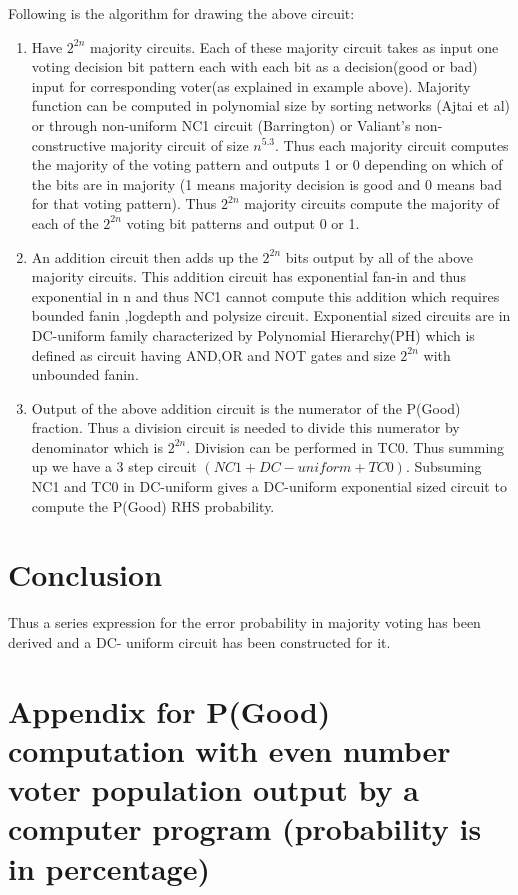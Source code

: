 \documentclass[11pt,onecolumn]{article}
\begin{document}
Following is the algorithm for drawing the above circuit:
\begin{enumerate}
\item Have $2^{2n}$ majority circuits. Each of these majority circuit takes as input one voting
decision bit pattern each with each bit as a decision(good or bad) input for
corresponding voter(as explained in example above). Majority function can be computed
in polynomial size by sorting networks (Ajtai et al) or through non-uniform NC1 circuit
(Barrington) or Valiant's non-constructive majority circuit of size $n^{5.3}$. Thus each
majority circuit computes the majority of the voting pattern and outputs 1 or 0 depending
on which of the bits are in majority (1 means majority decision is good and 0 means bad
for that voting pattern). Thus $2^{2n}$ majority circuits compute the majority of each of the
$2^{2n}$ voting bit patterns and output 0 or 1.
\item An addition circuit then adds up the $2^{2n}$ bits output by all of the above majority circuits.
This addition circuit has exponential fan-in and thus exponential in n and thus NC1
cannot compute this addition which requires bounded fanin ,logdepth and polysize circuit.
Exponential sized circuits are in DC-uniform family characterized by Polynomial
Hierarchy(PH) which is defined as circuit
having AND,OR and NOT gates and size $2^{2n}$ with unbounded fanin.
\item Output of the above addition circuit is the numerator of the P(Good) fraction. Thus a
division circuit is needed to divide this numerator by denominator which is $2^{2n}$. Division
can be performed in TC0. Thus summing up we have a 3 step circuit $(NC1 + DC-uniform
+ TC0)$. Subsuming NC1 and TC0 in DC-uniform gives a DC-uniform exponential sized
circuit to compute the P(Good) RHS probability.
\end{enumerate}

\section{Conclusion}
Thus a series expression for the error probability in majority voting has been derived and a DC-
uniform circuit has been constructed for it.

\section{Appendix for P(Good) computation with even number voter population output by a computer program (probability is in percentage)}
\end{document}
